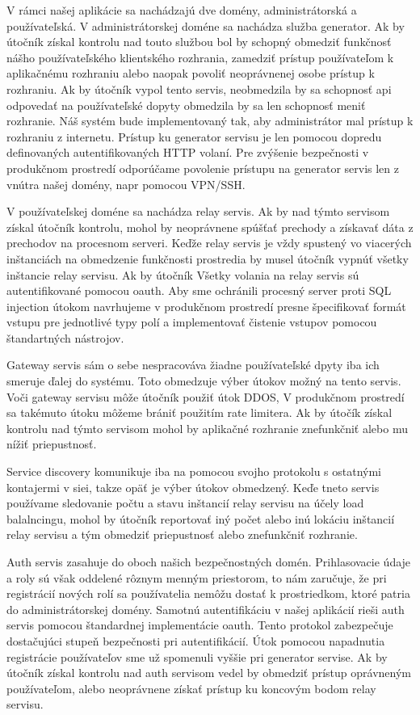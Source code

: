 V rámci našej aplikácie sa nachádzajú dve domény, administrátorská a používateľská. V administrátorskej doméne sa nachádza služba generator. Ak by útočník získal kontrolu nad touto službou bol by schopný obmedziť funkčnosť nášho používateľského klientského rozhrania, zamedziť prístup používateľom k aplikačnému rozhraniu alebo naopak povoliť neoprávnenej osobe prístup k rozhraniu. Ak by útočník vypol  tento servis, neobmedzila by  sa schopnosť \acrshort{api} odpovedať na používateľské dopyty obmedzila  by sa len schopnosť meniť rozhranie. Náš systém bude implementovaný tak, aby administrátor mal prístup k rozhraniu z internetu. Prístup ku generator servisu je len pomocou dopredu definovaných autentifikovaných HTTP volaní. Pre zvýšenie bezpečnosti v produkčnom prostredí odporúčame povolenie prístupu na generator servis len z vnútra našej domény, napr pomocou VPN/SSH.

V používateľskej doméne sa nachádza relay servis. Ak by nad týmto servisom získal útočník kontrolu, mohol by neoprávnene spúšťať prechody a získavať dáta z prechodov na procesnom serveri. Keďže relay servis je vždy spustený vo viacerých inštanciách na obmedzenie funkčnosti prostredia by musel útočník vypnúť všetky inštancie relay servisu. Ak by útočník Všetky volania na relay servis sú autentifikované pomocou \acrshort{oauth}.  Aby sme ochránili procesný server proti SQL injection útokom navrhujeme v produkčnom prostredí presne špecifikovať formát vstupu pre jednotlivé typy polí a  implementovať čistenie vstupov pomocou štandartných nástrojov.

Gateway servis sám o sebe nespracováva žiadne používateľské dpyty iba ich smeruje ďalej do systému. Toto obmedzuje výber útokov možný na tento servis. Voči gateway servisu môže útočník použiť útok DDOS, V produkčnom prostredí sa takémuto útoku môžeme brániť použitím rate limitera. Ak by útočík získal kontrolu nad týmto servisom mohol by aplikačné rozhranie znefunkčniť alebo mu nížiť priepustnosť.

Service discovery komunikuje iba na pomocou svojho protokolu s ostatnými kontajermi v siei, takze opäť je výber útokov obmedzený. Keďe tneto servis používame sledovanie počtu a stavu inštancií relay servisu na účely load balalncingu, mohol by útočník reportovať iný počet alebo inú lokáciu inštancií relay servisu a tým obmedziť priepustnosť alebo znefunkčniť rozhranie.

Auth servis zasahuje do oboch našich bezpečnostných domén. Prihlasovacie údaje a roly sú však oddelené rôznym menným priestorom, to nám zaručuje, že pri registrácií nových rolí sa používatelia nemôžu dostať k prostriedkom, ktoré patria do administrátorskej domény. Samotnú
autentifikáciu v našej aplikácií rieši auth servis pomocou štandardnej implementácie \acrshort{oauth}. Tento protokol zabezpečuje dostačujúci stupeň bezpečnosti pri autentifikácií. Útok pomocou napadnutia registrácie používateľov sme už spomenuli vyššie pri generator servise. Ak by útočník získal kontrolu nad auth servisom vedel by obmedziť prístup oprávneným používateľom, alebo neoprávnene získať prístup ku koncovým bodom relay servisu.

